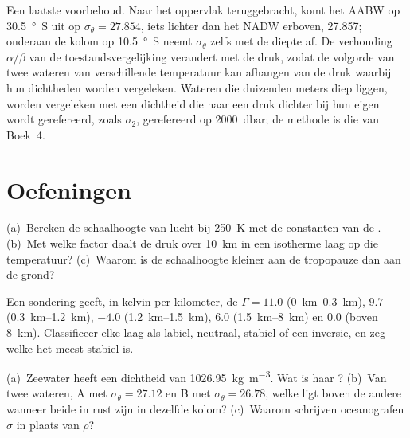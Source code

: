 Een laatste voorbehoud. Naar het oppervlak teruggebracht, komt het AABW op \qty{30.5}{\degree S} uit op $\sigma_\theta = 27.854$, iets lichter dan het NADW erboven, \num{27.857}; onderaan de kolom op \qty{10.5}{\degree S} neemt $\sigma_\theta$ zelfs met de diepte af. De verhouding $\alpha/\beta$ van de toestandsvergelijking verandert met de druk, zodat de volgorde van twee wateren van verschillende temperatuur kan afhangen van de druk waarbij hun dichtheden worden vergeleken. Wateren die duizenden meters diep liggen, worden vergeleken met een dichtheid die naar een druk dichter bij hun eigen wordt gerefereerd, zoals $\sigma_2$, gerefereerd op \qty{2000}{dbar}; de methode is die van Boek~4.

\section{Oefeningen}

\begin{exercise}[$\star$]\label{exo:b1:fluid-envelopes-structure:1}
(a)~Bereken de schaalhoogte van lucht bij \qty{250}{K} met de constanten van de . (b)~Met welke factor daalt de druk over \qty{10}{km} in een isotherme laag op die temperatuur? (c)~Waarom is de schaalhoogte kleiner aan de tropopauze dan aan de grond?
\end{exercise}

\begin{exercise}[$\star$]\label{exo:b1:fluid-envelopes-structure:2}
Een sondering geeft, in kelvin per kilometer, de  $\Gamma = 11.0$
(\qtyrange{0}{0.3}{km}), $9.7$ (\qtyrange{0.3}{1.2}{km}), $-4.0$
(\qtyrange{1.2}{1.5}{km}), $6.0$ (\qtyrange{1.5}{8}{km}) en $0.0$ (boven
\qty{8}{km}). Classificeer elke laag als labiel, neutraal, stabiel of een inversie, en zeg welke het meest stabiel is.
\end{exercise}

\begin{exercise}[$\star$]\label{exo:b1:fluid-envelopes-structure:3}
(a)~Zeewater heeft een dichtheid van \qty{1026.95}{kg.m^{-3}}. Wat is haar ? (b)~Van twee wateren, A met $\sigma_\theta = 27.12$ en B met $\sigma_\theta = 26.78$, welke ligt boven de andere wanneer beide in rust zijn in dezelfde kolom? (c)~Waarom schrijven oceanografen $\sigma$ in plaats van $\rho$?
\end{exercise}

